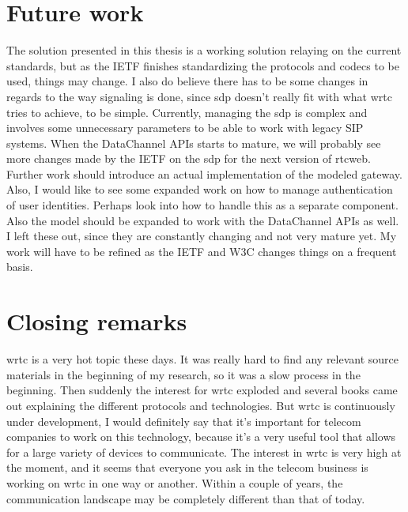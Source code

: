 \section{Future work}
The solution presented in this thesis is a working solution relaying on the current standards, but as the IETF finishes standardizing the protocols and codecs to be used, things may change. I also do believe there has to be some changes in regards to the way signaling is done, since \gls{sdp} doesn't really fit with what \gls{wrtc} tries to achieve, to be simple. Currently, managing the \gls{sdp} is complex and involves some unnecessary parameters to be able to work with legacy SIP systems. When the DataChannel APIs starts to mature, we will probably see more changes made by the IETF on the \gls{sdp} for the next version of \gls{rtcweb}. Further work should introduce an actual implementation of the modeled gateway. Also, I would like to see some expanded work on how to manage authentication of user identities. Perhaps look into how to handle this as a separate component. Also the model should be expanded to work with the DataChannel APIs as well. I left these out, since they are constantly changing and not very mature yet. My work will have to be refined as the IETF and W3C changes things on a frequent basis.

\section{Closing remarks}
\gls{wrtc} is a very hot topic these days. It was really hard to find any relevant source materials in the beginning of my research, so it was a slow process in the beginning. Then suddenly the interest for \gls{wrtc} exploded and several books came out explaining the different protocols and technologies. But \gls{wrtc} is continuously under development, I would definitely say that it's important for telecom companies to work on this technology, because it's a very useful tool that allows for a large variety of devices to communicate. The interest in \gls{wrtc} is very high at the moment, and it seems that everyone you ask in the telecom business is working on \gls{wrtc} in one way or another. Within a couple of years, the communication landscape may be completely different than that of today.